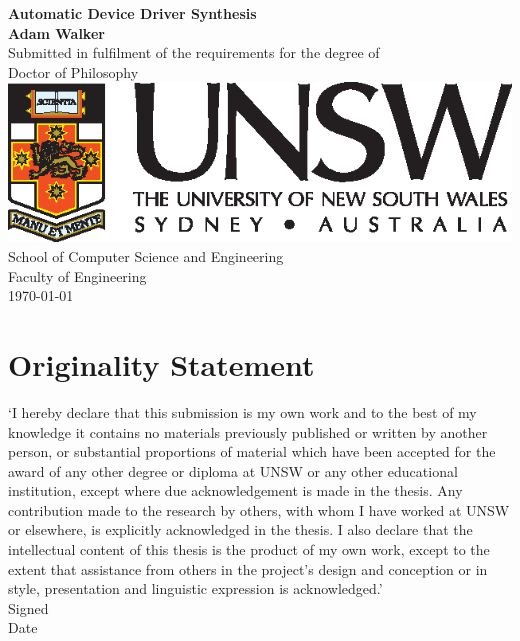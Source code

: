 \documentclass[a4paper,twoside,openright,11pt,oldfontcommands]{memoir}
\theoremstyle{definition}
\begin{document}
\frontmatter

\thispagestyle{empty}
\mbox{}
\vfill
\begin{center}
{\Huge\sffamily\textbf{Automatic Device Driver Synthesis}}\\[2cm]
{\Large\sffamily\bfseries Adam Walker}\\[2cm]
Submitted in fulfilment of the requirements for the degree of \\
Doctor of Philosophy\\[1cm]
\includegraphics{imgs/unsw} \\[1cm]
School of Computer Science and Engineering \\[0.5cm]
Faculty of Engineering \\[2cm]
\monthyear\today
\end{center}
\par
\vfill
\clearpage

\thispagestyle{plain}
\section*{Originality Statement}

`I hereby declare that this submission is my own work and to the best of my
knowledge it contains no materials previously published or written by another
person, or substantial proportions of material which have been accepted for
the award of any other degree or diploma at UNSW or any other educational
institution, except where due acknowledgement is made in the thesis. Any
contribution made to the research by others, with whom I have worked at UNSW
or elsewhere, is explicitly acknowledged in the thesis.  I also declare that
the intellectual content of this thesis is the product of my own work, except
to the extent that assistance from others in the project's design and
conception or in style, presentation and linguistic expression is
acknowledged.'\\[0.5cm]
Signed\hspace{0.5cm}\dotfill\hfill\\[0.5cm]
Date\hspace{0.5cm}\dotfill\hfill\\
\vfil\newpage
\end{document}

